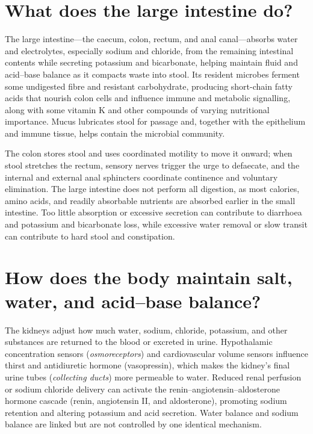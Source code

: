 \documentclass[11pt,oneside]{report}
\begin{document}
\section{What does the large intestine do?}

The large intestine---the caecum, colon, rectum, and anal canal---absorbs water
and electrolytes, especially sodium and chloride, from the remaining intestinal
contents while secreting potassium and bicarbonate, helping maintain fluid and
acid--base balance as it compacts waste into stool. Its resident microbes ferment
some undigested fibre and resistant carbohydrate, producing short-chain fatty
acids that nourish colon cells and influence immune and metabolic signalling,
along with some vitamin K and other compounds of varying nutritional
importance. Mucus lubricates stool for passage and, together with the
epithelium and immune tissue, helps contain the microbial community.

The colon stores stool and uses coordinated motility to move it onward; when
stool stretches the rectum, sensory nerves trigger the urge to defaecate, and
the internal and external anal sphincters coordinate continence and voluntary
elimination. The large intestine does not perform all digestion, as most
calories, amino acids, and readily absorbable nutrients are absorbed earlier in
the small intestine. Too little absorption or excessive secretion can contribute
to diarrhoea and potassium and bicarbonate loss, while excessive water removal
or slow transit can contribute to hard stool and constipation.

\section{How does the body maintain salt, water, and acid--base balance?}

The kidneys adjust how much water, sodium, chloride, potassium, and other
substances are returned to the blood or excreted in urine. Hypothalamic concentration sensors (\emph{osmoreceptors}) and cardiovascular
volume sensors influence thirst and antidiuretic hormone (vasopressin), which
makes the kidney's final urine tubes (\emph{collecting ducts}) more permeable
to water. Reduced renal perfusion or sodium chloride delivery can activate the
renin--angiotensin--aldosterone hormone cascade (renin, angiotensin II, and
aldosterone), promoting sodium retention and altering potassium and acid
secretion. Water balance and sodium balance are linked but are not controlled by
one identical mechanism.
\end{document}
